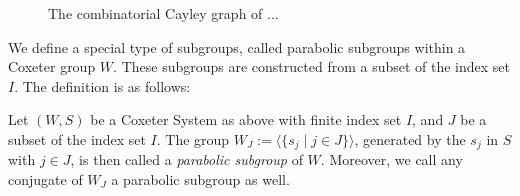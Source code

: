 \begin{figure}[h]
    \caption{The combinatorial Cayley graph of ...}
    \label{fig:cayleygraphs}
    
    \centering
\end{figure}

We define a special type of subgroups, called parabolic subgroups within a Coxeter group \(W\).
These subgroups are constructed from a subset of the index set \(I\).
The definition is as follows:

\begin{definition}
    Let \((W,S)\) be a Coxeter System as above with finite index set \(I\), and \(J\) be a subset of the index set \(I\).
    The group \(W_J := \langle\{s_j \;\vert\; j\in J\}\rangle\), generated by the \(s_j\) in \(S\) with \(j \in J\), is then called a \emph{parabolic subgroup} of \(W\).
    Moreover, we call any conjugate of \(W_J\) a parabolic subgroup as well.
\end{definition}

